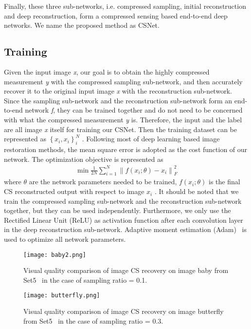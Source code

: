 \documentclass[5pt]{article}
\begin{document}
Finally, these three sub-networks, i.e. compressed sampling, initial reconstruction and deep reconstruction, form a compressed sensing based end-to-end deep networks. We name the proposed method as CSNet.

\subsection{Training}

Given the input image \emph{x}, our goal is to obtain the highly compressed measurement \emph{y} with the compressed sampling sub-network, and then accurately recover it to the original input image \emph{x} with the reconstruction sub-network. Since the sampling sub-network and the reconstruction sub-network form an end-to-end network \emph{f}, they can be trained together and do not need to be concerned with what the compressed measurement \emph{y} is. Therefore, the input and the label are all image \emph{x} itself for training our CSNet. Then the training dataset can be represented as $\left\{ {{x_i},{x_i}} \right\}_i^N$ . Following most of deep learning based image restoration methods, the mean square error is adopted as the cost function of our network. The optimization objective is represented as
\begin{eqnarray}
\min \frac{1}{{2N}}\sum\nolimits_{i = 1}^N {\left\| {f\left( {{x_i};\theta } \right) - {x_i}} \right\|} _F^2
\end{eqnarray}
where $\theta $ are the network parameters needed to be trained, $f\left( {{x_i};\theta } \right)$  is the final CS reconstructed output with respect to image ${x_i}$ . It should be noted that we train the compressed sampling sub-network and the reconstruction sub-network together, but they can be used independently. Furthermore, we only use the Rectified Linear Unit (ReLU) as activation function after each convolution layer in the deep reconstruction sub-network. Adaptive moment estimation (Adam)~\cite{rf21} is used to optimize all network parameters.

\begin{figure*}[t]
\centering
\texttt{[image: baby2.png]}%
\vspace{-15pt}
\caption{\small {Visual quality comparison of image CS recovery on image baby from Set5~\cite{rf23} in the case of sampling ratio = 0.1.}}
\vspace{-5pt}
\label{fig:fig3}
\end{figure*}

\begin{figure*}[t]
\setlength{\abovecaptionskip}{-10pt}
\setlength{\belowcaptionskip}{0pt}
\centering
\texttt{[image: butterfly.png]}
\vspace{-25pt}
\caption{\small {Visual quality comparison of image CS recovery on image butterfly from Set5~\cite{rf23} in the case of sampling ratio = 0.3.}}
\label{fig:fig4}
\vspace{-10pt}
\end{figure*}
\end{document}
